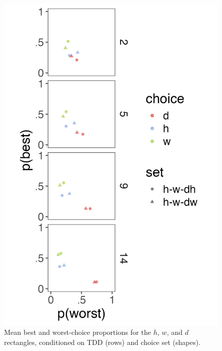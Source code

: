 {{{{\begin{figure}
   \includegraphics[width=\linewidth]{figures/crit_mean_choice_by_set_dist_labelHW.jpeg}
   \caption{Mean best and worst-choice proportions for the $h$, $w$, and $d$ rectangles, conditioned on TDD (rows) and choice set (shapes).}
   \label{fig:bw_mean_choice_by_set}
 \end{figure}

}}}}
